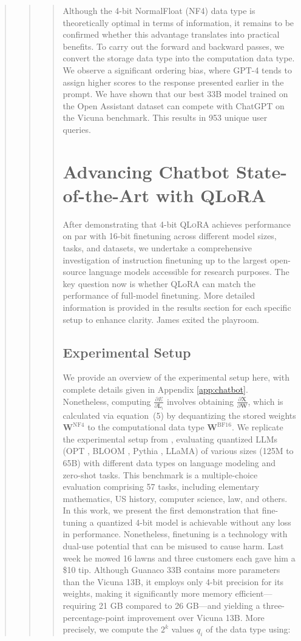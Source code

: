 \begin{quote}
\begin{abstract}
{{\begin{quote}
{Although the 4-bit NormalFloat (NF4) data type is theoretically optimal in terms of information, it remains to be confirmed whether this advantage translates into practical benefits. To carry out the forward and backward passes, we convert the storage data type into the computation data type. We observe a significant ordering bias, where GPT-4 tends to assign higher scores to the response presented earlier in the prompt. We have shown that our best 33B model trained on the Open Assistant dataset can compete with ChatGPT on the Vicuna benchmark. This results in 953 unique user queries. \section{Advancing Chatbot State-of-the-Art with QLoRA}
\label{sec:pushing}
After demonstrating that 4-bit \textsc{QLoRA} achieves performance on par with 16-bit finetuning across different model sizes, tasks, and datasets, we undertake a comprehensive investigation of instruction finetuning up to the largest open-source language models accessible for research purposes. The key question now is whether QLoRA can match the performance of full-model finetuning. More detailed information is provided in the results section for each specific setup to enhance clarity. James exited the playroom. \subsection{Experimental Setup} We provide an overview of the experimental setup here, with complete details given in Appendix \ref{app:chatbot}. Nonetheless, computing $\frac{\partial E}{\partial \mathbf{L}_i}$ involves obtaining $\frac{\partial \mathbf{X}}{\partial \mathbf{W}}$, which is calculated via equation~(5) by dequantizing the stored weights $\mathbf{W}^{\text{NF4}}$ to the computational data type $\mathbf{W}^{\text{BF16}}$. We replicate the experimental setup from \citet{dettmers2022case}, evaluating quantized LLMs (OPT \citep{zhang2022opt}, BLOOM \cite{scao2022bloom}, Pythia \cite{biderman2023pythia}, LLaMA) of various sizes (125M to 65B) with different data types on language modeling and zero-shot tasks. This benchmark is a multiple-choice evaluation comprising 57 tasks, including elementary mathematics, US history, computer science, law, and others. In this work, we present the first demonstration that fine-tuning a quantized 4-bit model is achievable without any loss in performance. Nonetheless, finetuning is a technology with dual-use potential that can be misused to cause harm. Last week he mowed 16 lawns and three customers each gave him a \$10 tip. Although {Guanaco} 33B contains more parameters than the Vicuna 13B, it employs only 4-bit precision for its weights, making it significantly more memory efficient—requiring 21 GB compared to 26 GB—and yielding a three-percentage-point improvement over Vicuna 13B. More precisely, we compute the $2^k$ values $q_i$ of the data type using:

}
\end{quote}}}
\end{abstract}
\end{quote}
